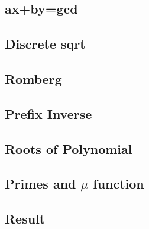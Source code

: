 \documentclass[a4paper,10pt,twocolumn,oneside]{article}
\begin{document}
\subsection{ax+by=gcd}


\subsection{Discrete sqrt}


%

\subsection{Romberg}


%

\subsection{Prefix Inverse}


\subsection{Roots of Polynomial}


%

\subsection{Primes and $\mu$ function}


\subsection{Result}

\end{document}
